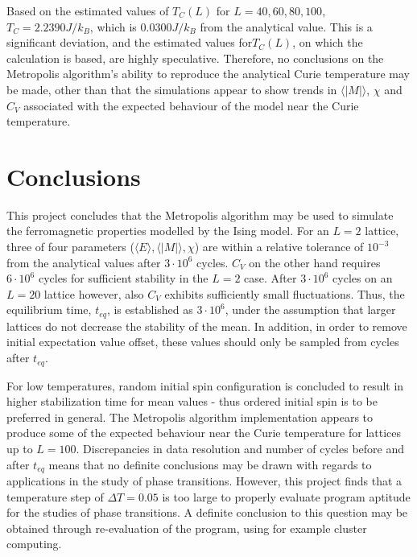 \documentclass[%
oneside,                 %
final,                   %
10pt]{article}
\begin{document}
Based on the estimated values of $T_C(L)$ for $L=40,60,80,100$, $T_C=2.2390 J/k_B$, which is $0.0300 J/k_B$ from the analytical value. This is a significant deviation, and the estimated values for$T_C(L)$, on which the calculation is based, are highly speculative. Therefore, no conclusions on the Metropolis algorithm's ability to reproduce the analytical Curie temperature may be made, other than that the simulations appear to show trends in $\langle |M| \rangle$, $\chi$ and $C_V$ associated with the expected behaviour of the model near the Curie temperature.

\section{Conclusions}
This project concludes that the Metropolis algorithm may be used to simulate the ferromagnetic properties modelled by the Ising model. For an $L=2$ lattice, three of four parameters ($\langle E \rangle, \langle |M| \rangle, \chi$) are within a relative tolerance of $10^{-3}$ from the analytical values after $3 \cdot 10^6$ cycles. $C_V$ on the other hand requires $6 \cdot 10^6$ cycles for sufficient stability in the $L=2$ case. After $3\cdot 10^6$ cycles on an $L=20$ lattice however, also $C_V$ exhibits sufficiently small fluctuations.  Thus, the equilibrium time, $t_{eq}$, is established as $3\cdot 10^6$, under the assumption that larger lattices do not decrease the  stability of the mean. In addition, in order to remove initial expectation value offset, these values should only be sampled from cycles after $t_{eq}$. \newline

For low temperatures, random initial spin configuration is concluded to result in higher stabilization time for mean values - thus ordered initial spin is to be preferred in general. The Metropolis algorithm implementation appears to produce some of the expected behaviour near the Curie temperature for lattices up to $L=100$. Discrepancies in data resolution and number of cycles before and after $t_{eq}$ means that no definite conclusions may be drawn with regards to applications in the study of phase transitions. However, this project finds that a temperature step of $\Delta T = 0.05 $ is too large to properly evaluate program aptitude for the studies of phase transitions. A definite conclusion to this question may be obtained through re-evaluation of the program, using for example cluster computing.



\end{document}
